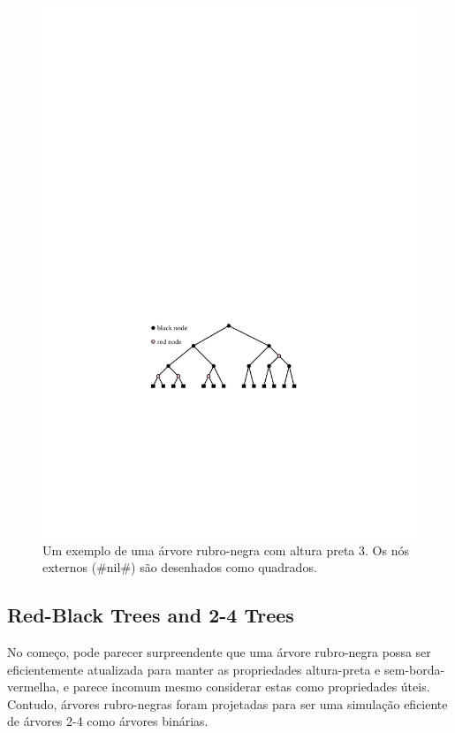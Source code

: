 \begin{figure}
	\begin{center}
		\includegraphics[scale=0.90909]{figs/24rb-1}
	\end{center}
	\caption[A red-black tree]{Um exemplo de uma árvore rubro-negra com altura preta 3. Os nós externos (#nil#) são desenhados como quadrados.}
\end{figure}


\subsection{Red-Black Trees and 2-4 Trees}

No começo, pode parecer surpreendente que uma árvore rubro-negra possa ser eficientemente
atualizada para manter as propriedades altura-preta e sem-borda-vermelha, e
parece incomum mesmo considerar estas como propriedades úteis. Contudo,
árvores rubro-negras foram projetadas para ser uma simulação eficiente de árvores 2-4
como árvores binárias.

